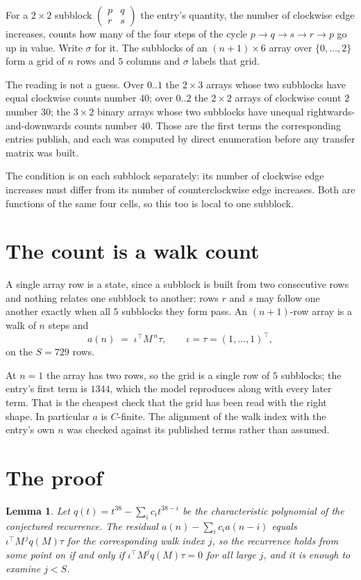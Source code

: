 \documentclass[11pt,a4paper]{article}
\theoremstyle{plain}
\newtheorem{lemma}[theorem]{Lemma}
\theoremstyle{definition}
\begin{document}
For a $2\times2$ subblock $\begin{pmatrix}p&q\\r&s\end{pmatrix}$ the
entry's quantity, the number of clockwise edge increases, counts how many of the four steps of the cycle $p\to q\to s\to r\to p$ go up in value. Write $\sigma$ for it. The subblocks of an
$(n+1)\times6$ array over $\{0,\dots,2\}$ form a grid of $n$ rows and $5$
columns and $\sigma$ labels that grid.

The reading is not a guess. Over $0..1$ the $2\times3$ arrays whose two subblocks have equal
clockwise counts number $40$; over $0..2$ the $2\times2$ arrays of clockwise count $2$ number
$30$; the $3\times2$ binary arrays whose two subblocks have unequal rightwards-and-downwards
counts number $40$. Those are the first terms the corresponding entries publish, and each was
computed by direct enumeration before any transfer matrix was built.

The condition is on each subblock separately: its number of clockwise edge increases must differ from its number
of counterclockwise edge increases. Both are functions of the same four cells, so this too is local to one
subblock.

\section{The count is a walk count}

A single array row is a state, since a subblock is built from two
consecutive rows and nothing relates one subblock to another: rows $r$ and $s$ may follow one
another exactly when all $5$ subblocks they form pass. An $(n+1)$-row array is a walk of $n$
steps and
\[
a(n)\;=\;\iota^{\!\top}M^{\,n}\tau,\qquad\iota=\tau=(1,\dots,1)^{\!\top},
\]
on the $S=729$ rows.

At $n=1$ the array has two rows, so the grid is a single row of $5$
subblocks; the entry's first term is $1344$, which the model
reproduces along with every later term. That is the cheapest check that the grid has been read
with the right shape.
In particular $a$ is $C$-finite. The alignment of the walk index with the entry's own $n$ was
checked against its published terms rather than assumed.

\section{The proof}

\begin{lemma}\label{lem:crit}
Let $q(t)=t^{38}-\sum_i c_it^{38-i}$ be the characteristic polynomial of the
conjectured recurrence. The residual $a(n)-\sum_ic_ia(n-i)$ equals
$\iota^{\!\top}M^{\,j}q(M)\tau$ for the corresponding walk index $j$, so the recurrence
holds from some point on if and only if $\iota^{\!\top}M^{j}q(M)\tau=0$ for all large $j$,
and it is enough to examine $j<S$.
\end{lemma}
\end{document}
